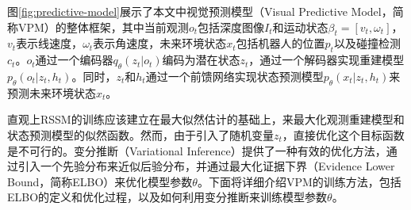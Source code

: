 图\ref{fig:predictive-model}展示了本文中视觉预测模型（Visual Predictive Model，简称VPM）的整体框架，其中当前观测$o_t$包括深度图像$I_t$和运动状态$\beta_t=[v_t, \omega_t]$，$v_t$表示线速度，$\omega_t$表示角速度，未来环境状态$x_t$包括机器人的位置$p_t$以及碰撞检测$c_t$。$o_t$通过一个编码器$q_{\theta}(z_t\vert o_t)$编码为潜在状态$z_t$，通过一个解码器实现重建模型$p_{\theta}(o_t\vert z_t, h_t)$。同时，$z_t$和$h_t$通过一个前馈网络实现状态预测模型$p_{\theta}(x_t\vert z_t, h_t)$来预测未来环境状态$x_t$。

直观上RSSM的训练应该建立在最大似然估计的基础上，来最大化观测重建模型和状态预测模型的似然函数。然而，由于引入了随机变量$z_t$，直接优化这个目标函数是不可行的。变分推断（Variational Inference）提供了一种有效的优化方法，通过引入一个先验分布来近似后验分布，并通过最大化证据下界（Evidence Lower Bound，简称ELBO）来优化模型参数$\theta$。下面将详细介绍VPM的训练方法，包括ELBO的定义和优化过程，以及如何利用变分推断来训练模型参数$\theta$。
